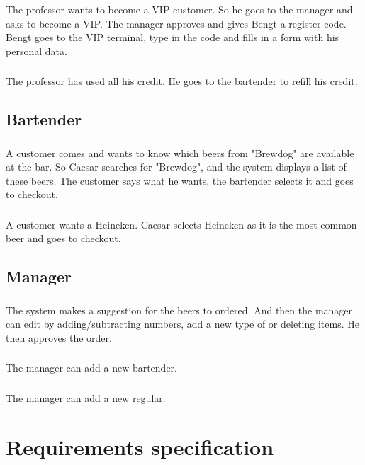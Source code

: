 \documentclass{article}
\begin{document}
\subsubsection{}
The professor wants to become a VIP customer. So he goes to the manager and asks to become a VIP. The manager approves and gives Bengt a register code. Bengt goes to the VIP terminal, type in the code and fills in a form with his personal data.
\subsubsection{}
The professor has used all his credit. He goes to the bartender to refill his credit. 
\subsection{Bartender}
\subsubsection{}
A customer comes and wants to know which beers from "Brewdog" are available at the bar. So Caesar searches for "Brewdog", and the system displays a list of these beers. The customer says what he wants, the bartender selects it and goes to checkout.
\subsubsection{}
A customer wants a Heineken. Caesar selects Heineken as it is the most common beer and goes to checkout.
\subsection{Manager}
\subsubsection{}
The system makes a suggestion for the beers to ordered. And then the manager can edit by adding/subtracting numbers, add a new type of or deleting items. He then approves the order.
\subsubsection{}
The manager can add a new bartender.
\subsubsection{}
The manager can add a new regular.
\section{Requirements specification}
\end{document}
